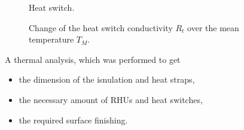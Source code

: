 \begin{figure}[h]
	\centering
	\qquad\qquad
	\caption{Heat switch.}
	\label{fig:tsc_switch01}
\end{figure}

\begin{figure}[h]
	\centering
	\qquad
	\caption{Change of the heat switch conductivity $R_t$ over the mean temperature $T_M$.}
	\label{fig:tsc_switch02}
\end{figure}


A thermal analysis, which was performed to get
\begin{itemize}
	\item the dimension of the isnulation and heat straps,
	\item the necessary amount of RHUs and heat switches,
	\item the required surface finishing.
\end{itemize}



